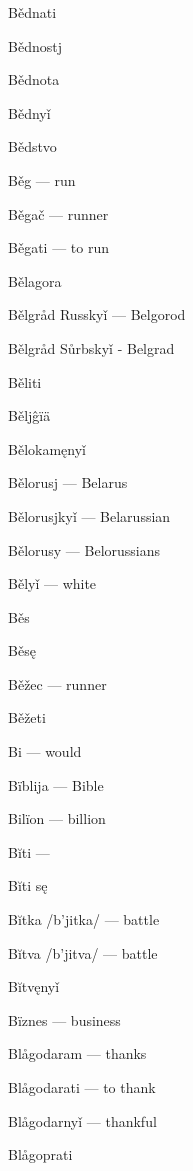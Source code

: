 Bědnati 

Bědnostj 

Bědnota 

Bědnyǐ 

Bědstvo 

Běg  — run

Běgač  — runner

Běgati  — to run

Bělagora 

Bělgråd Russkyǐ  — Belgorod

Bělgråd Sůrbskyǐ  - Belgrad

Běliti 

Běljĝïä 

Bělokamęnyǐ 

Bělorusj  — Belarus

Bělorusjkyǐ  — Belarussian

Bělorusy  — Belorussians

Bělyǐ  — white

Běs 

Běsę 

Běžec  — runner

Běžeti 

Bi  — would

Bïblija  — Bible

Bilïon  — billion

Bĭti  —

Bĭti sę 

Bĭtka /b’jitka/ — battle

Bĭtva /b’jitva/ — battle

Bĭtvęnyǐ 

Bïznes  — business

Blågodaram  — thanks

Blågodarati  — to thank

Blågodarnyǐ  — thankful

Blågoprati 

